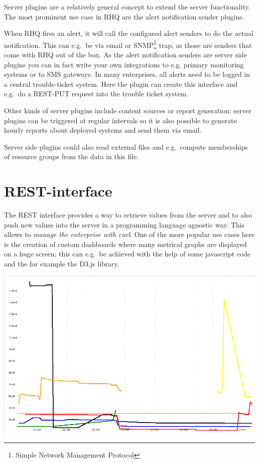 \documentclass[twocolumn,10pt,a4paper]{article}
\begin{document}
Server plugins are a relatively general concept to extend the server functionality. The most prominent use case in RHQ are the alert notification sender plugins. 

When RHQ fires an alert, it will call the configured alert senders to do the actual notification. This can e.g.\ be via email or SNMP\footnote{Simple Network Management Protocol} trap, as those are senders that come with RHQ out of the box. As the alert notification senders are server side plugins you can in fact write your own integrations to e.g. primary monitoring systems or to SMS gateways. In many enterprises, all alerts need to be logged in a central trouble-ticket system. Here the plugin can create this interface and e.g.\ do a REST-PUT request into the trouble ticket system.

Other kinds of server plugins include content sources or report generation: server plugins can be triggered at regular intervals so it is also possible to generate hourly reports about deployed systems and send them via email. 

Server side plugins could also read external files and e.g.\ compute memberships of resource groups from the data in this file.

\section{REST-interface}

The REST interface provides a way to retrieve values from the server and to also
push new values into the server in a programming language agnostic way.
This allows to \emph{manage the enterprise with curl}. One of the more
popular use cases here is the creation of custom dashboards where many metrical
graphs are displayed on a huge screen; this can e.g.\ be achieved with the help
of some javascript code and the for example the D3.js library.

\noindent\includegraphics[width=\columnwidth]{graph/multigraph.png}
\end{document}
